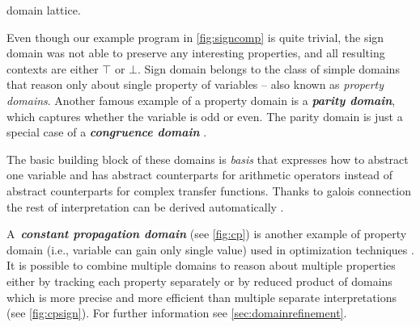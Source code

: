 \begin{marginfigure}%
    \centering
{}
    \caption{ domain lattice.}
    \label{fig:cp}%
\end{marginfigure}%

Even though our example program in \autoref{fig:signcomp} is quite trivial, the
sign domain  was not able to preserve any interesting properties,
and all resulting contexts are either $\top$ or $\bot$.  Sign domain belongs to
the class of simple domains that reason only about single property of variables --
also known as \emph{property domains}. Another famous example of a property
domain is a \textbf{\emph{parity domain}}, which captures whether the
variable is odd or even. The parity domain is just a special case of a
\textbf{\emph{congruence domain}} \cite{Granger1989, Granger1991}.

The basic building block of these domains is \emph{basis} that expresses how to
abstract one variable and has abstract counterparts for arithmetic operators
instead of abstract counterparts for complex transfer functions. Thanks to
galois connection the rest of interpretation can be derived automatically
\cite{Mine2004Thesis}.

A~\textbf{\emph{constant propagation domain}}  (see
\autoref{fig:cp}) is another example of property domain (i.e., variable can
gain only single value) used in optimization techniques \cite{Kildall1973}.  It
is possible to combine multiple domains to reason about multiple properties
either by tracking each property separately or by reduced product of domains
which is more precise and more efficient than multiple separate interpretations
\cite{Cousot2011b} (see \autoref{fig:cpsign}). For further information see
\autoref{sec:domainrefinement}.

